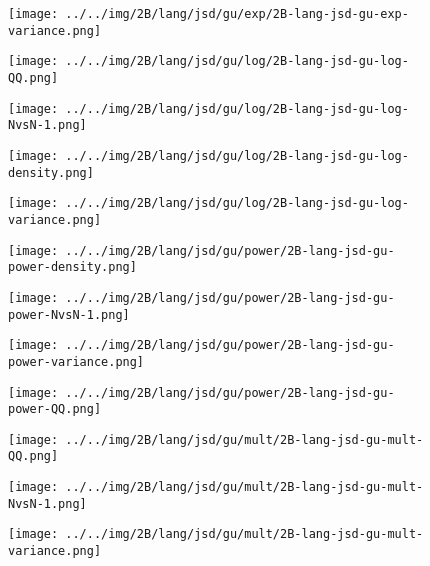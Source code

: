 \begin{figure}[H]
\centering	\texttt{[image: ../../img/2B/lang/jsd/gu/exp/2B-lang-jsd-gu-exp-variance.png]}
\end{figure}
\begin{figure}[H]
\centering	\texttt{[image: ../../img/2B/lang/jsd/gu/log/2B-lang-jsd-gu-log-QQ.png]}
\end{figure}
\begin{figure}[H]
\centering	\texttt{[image: ../../img/2B/lang/jsd/gu/log/2B-lang-jsd-gu-log-NvsN-1.png]}
\end{figure}
\begin{figure}[H]
\centering	\texttt{[image: ../../img/2B/lang/jsd/gu/log/2B-lang-jsd-gu-log-density.png]}
\end{figure}
\begin{figure}[H]
\centering	\texttt{[image: ../../img/2B/lang/jsd/gu/log/2B-lang-jsd-gu-log-variance.png]}
\end{figure}
\begin{figure}[H]
\centering	\texttt{[image: ../../img/2B/lang/jsd/gu/power/2B-lang-jsd-gu-power-density.png]}
\end{figure}
\begin{figure}[H]
\centering	\texttt{[image: ../../img/2B/lang/jsd/gu/power/2B-lang-jsd-gu-power-NvsN-1.png]}
\end{figure}
\begin{figure}[H]
\centering	\texttt{[image: ../../img/2B/lang/jsd/gu/power/2B-lang-jsd-gu-power-variance.png]}
\end{figure}
\begin{figure}[H]
\centering	\texttt{[image: ../../img/2B/lang/jsd/gu/power/2B-lang-jsd-gu-power-QQ.png]}
\end{figure}
\begin{figure}[H]
\centering	\texttt{[image: ../../img/2B/lang/jsd/gu/mult/2B-lang-jsd-gu-mult-QQ.png]}
\end{figure}
\begin{figure}[H]
\centering	\texttt{[image: ../../img/2B/lang/jsd/gu/mult/2B-lang-jsd-gu-mult-NvsN-1.png]}
\end{figure}
\begin{figure}[H]
\centering	\texttt{[image: ../../img/2B/lang/jsd/gu/mult/2B-lang-jsd-gu-mult-variance.png]}
\end{figure}

